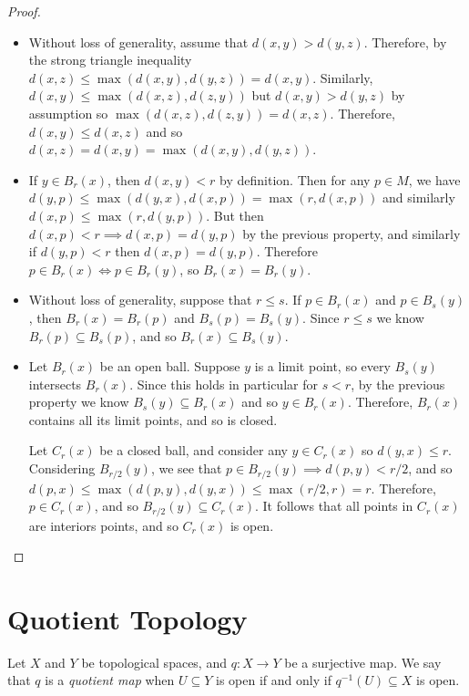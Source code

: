 \begin{proof}\proofbreak
    \begin{itemize}
        \item Without loss of generality, assume that $d(x, y) > d(y,z)$. Therefore, by the strong triangle inequality $d(x, z) \leq \max(d(x,y),d(y,z)) = d(x,y)$. Similarly, $d(x,y) \leq \max(d(x,z),d(z,y))$ but $d(x,y) > d(y,z)$ by assumption so $\max(d(x,z),d(z,y)) = d(x,z)$. Therefore, $d(x,y) \leq d(x,z)$ and so $d(x,z) = d(x,y) = \max(d(x,y),d(y,z))$.
        \item If $y \in B_r(x)$, then $d(x,y) < r$ by definition. Then for any $p \in M$, we have $d(y, p) \leq \max(d(y,x), d(x,p)) = \max(r, d(x, p))$ and similarly $d(x,p) \leq \max(r, d(y, p))$. But then $d(x, p) < r \implies d(x,p) = d(y,p)$ by the previous property, and similarly if $d(y,p) < r$ then $d(x,p) = d(y,p)$. Therefore $p \in B_r(x) \iff p \in B_r(y)$, so $B_r(x) = B_r(y)$.
        \item Without loss of generality, suppose that $r \leq s$. If $p \in B_r(x)$ and $p \in B_s(y)$, then $B_r(x) = B_r(p)$ and $B_s(p) = B_s(y)$. Since $r \leq s$ we know $B_r(p) \subseteq B_s(p)$, and so $B_r(x) \subseteq B_s(y)$.
        \item Let $B_r(x)$ be an open ball. Suppose $y$ is a limit point, so every $B_s(y)$ intersects $B_r(x)$. Since this holds in particular for $s < r$, by the previous property we know $B_s(y) \subseteq B_r(x)$ and so $y \in B_r(x)$. Therefore, $B_r(x)$ contains all its limit points, and so is closed.

        Let $C_r(x)$ be a closed ball, and consider any $y \in C_r(x)$ so $d(y, x) \leq r$. Considering $B_{r/2}(y)$, we see that $p \in B_{r/2}(y) \implies d(p, y) < r/2$, and so $d(p, x) \leq \max(d(p, y), d(y, x)) \leq \max(r/2, r) = r$. Therefore, $p \in C_r(x)$, and so $B_{r/2}(y) \subseteq C_r(x)$. It follows that all points in $C_r(x)$ are interiors points, and so $C_r(x)$ is open.
    \end{itemize}
\end{proof}

\section{Quotient Topology}

\begin{defn}
    Let $X$ and $Y$ be topological spaces, and $q: X \to Y$ be a surjective map. We say that $q$ is a \emph{quotient map} when $U \subseteq Y$ is open if and only if $q^{-1}(U) \subseteq X$ is open.
\end{defn}

